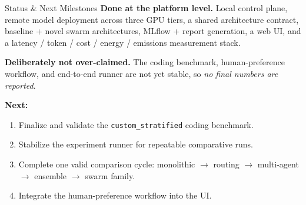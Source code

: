 \begin{block}{Status \& Next Milestones}
  \textbf{Done at the platform level.} Local control plane, remote model deployment
  across three GPU tiers, a shared architecture contract, baseline + novel swarm
  architectures, MLflow + report generation, a web UI, and a latency / token / cost /
  energy / emissions measurement stack.

  \vspace{6pt}
  \textbf{Deliberately not over-claimed.} The coding benchmark, human-preference
  workflow, and end-to-end runner are not yet stable, so \emph{no final numbers are
  reported}.

  \vspace{6pt}
  \textbf{Next:}
  \begin{enumerate}
    \item Finalize and validate the \texttt{custom\_stratified} coding benchmark.
    \item Stabilize the experiment runner for repeatable comparative runs.
    \item Complete one valid comparison cycle: monolithic $\to$ routing $\to$
          multi-agent $\to$ ensemble $\to$ swarm family.
    \item Integrate the human-preference workflow into the UI.
  \end{enumerate}
\end{block}
